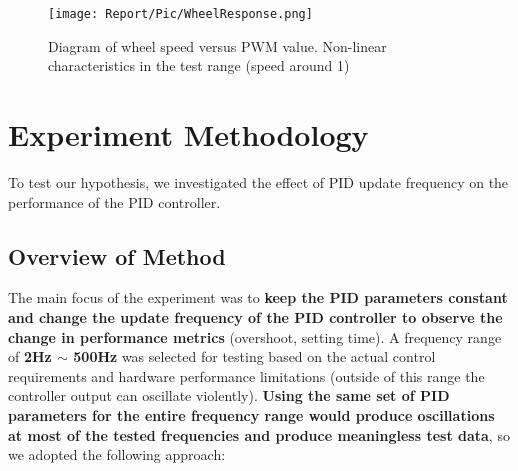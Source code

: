 \documentclass[conference]{IEEEtran}
\begin{document}
\begin{figure}[htbp]
\centerline{\texttt{[image: Report/Pic/WheelResponse.png]}}
\caption{Diagram of wheel speed versus PWM value. Non-linear characteristics in the test range (speed around 1)} %
\label{fig_WheelCharacter}
\end{figure}



\section{Experiment Methodology}
\label{Experiment Methodology}

To test our hypothesis, we investigated the effect of PID update frequency on the performance of the PID controller.

% 

\subsection{Overview of Method}
\label{PIDTuningMethod}
The main focus of the experiment was to \textbf{keep the PID parameters constant and change the update frequency of the PID controller to observe the change in performance metrics} (overshoot, setting time). A frequency range of \textbf{2Hz $\sim$ 500Hz} was selected for testing based on the actual control requirements and hardware performance limitations (outside of this range the controller output can oscillate violently). \textbf{Using the same set of PID parameters for the entire frequency range would produce oscillations at most of the tested frequencies and produce meaningless test data}, so we adopted the following approach: 
\end{document}
